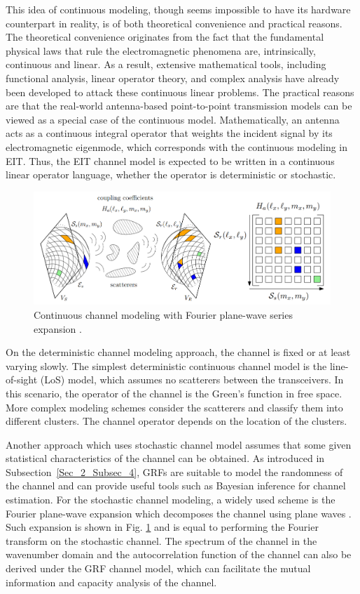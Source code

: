 \documentclass[journal,twocolumn]{IEEEtran}
\begin{document}
This idea of continuous modeling, though seems impossible to have its hardware counterpart in reality, is of both theoretical convenience and practical reasons. 
The theoretical convenience originates from the fact that the fundamental physical laws that rule the electromagnetic phenomena are, intrinsically, continuous and linear. 
As a result, extensive mathematical tools, including functional analysis, linear operator theory, and complex analysis have already been developed to attack these continuous linear problems. 
The practical reasons are that the real-world antenna-based point-to-point transmission models can be viewed as a special case of the continuous model. 
Mathematically, an antenna acts as a continuous integral operator that weights the incident signal by its electromagnetic eigenmode, which corresponds with the continuous modeling in EIT. 
Thus, the EIT channel model is expected to be written in a continuous linear operator language, whether the operator is deterministic or stochastic.
\begin{figure}
	\centering 
	\includegraphics[width=\linewidth]{figures/random_channel.png} 
	\caption{Continuous channel modeling with Fourier plane-wave series expansion \cite{marzetta2022fourier}.} 
	\label{fig:marzetta}
\end{figure}

On the deterministic channel modeling approach, the channel is fixed or at least varying slowly. The simplest deterministic continuous channel model is the line-of-sight (LoS) model, which assumes no scatterers between the transceivers. In this scenario, the operator of the channel is the Green's function in free space. More complex modeling schemes consider the scatterers and classify them into different clusters. The channel operator depends on the location of the clusters.

Another approach which uses stochastic channel model assumes that some given statistical characteristics of the channel can be obtained. As introduced in Subsection~\ref{Sec_2_Subsec_4}, GRFs are suitable to model the randomness of the channel and can provide useful tools such as Bayesian inference for channel estimation. For the stochastic channel modeling, a widely used scheme is the Fourier plane-wave expansion which decomposes the channel using plane waves \cite{marzetta2022fourier}. Such expansion is shown in Fig. \ref{fig:marzetta} and is equal to performing the Fourier transform on the stochastic channel. The spectrum of the channel in the wavenumber domain and the autocorrelation function of the channel can also be derived under the GRF channel model, which can facilitate the mutual information and capacity analysis of the channel.
\end{document}
